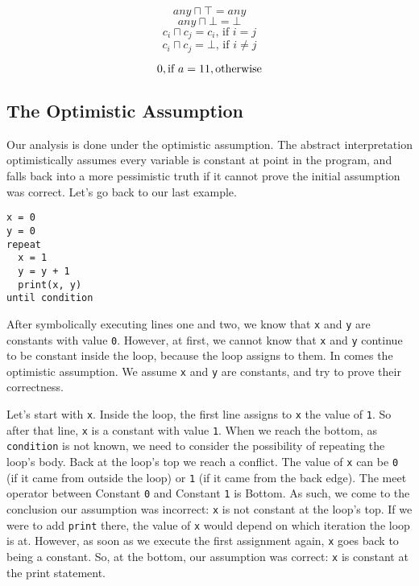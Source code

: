 \documentclass[
]{article}
\begin{document}
\[
any \sqcap \top = any
\] \[
any \sqcap \bot = \bot
\] \[
c_{i} \sqcap c_{j} = c_{i},\,\text{if } i = j
\] \[
c_{i} \sqcap c_{j} = \bot,\,\text{if } i \ne j
\]

\[
0, \text{if}\ a=1 \\
1, \text{otherwise}
\]

\hypertarget{the-optimistic-assumption}{%
\subsection{The Optimistic Assumption}\label{the-optimistic-assumption}}

Our analysis is done under the optimistic assumption. The abstract
interpretation optimistically assumes every variable is constant at
point in the program, and falls back into a more pessimistic truth if it
cannot prove the initial assumption was correct. Let's go back to our
last example.

\begin{verbatim}
x = 0
y = 0
repeat
  x = 1
  y = y + 1
  print(x, y)
until condition
\end{verbatim}

After symbolically executing lines one and two, we know that \texttt{x}
and \texttt{y} are constants with value \texttt{0}. However, at first,
we cannot know that \texttt{x} and \texttt{y} continue to be constant
inside the loop, because the loop assigns to them. In comes the
optimistic assumption. We assume \texttt{x} and \texttt{y} are
constants, and try to prove their correctness.

Let's start with \texttt{x}. Inside the loop, the first line assigns to
\texttt{x} the value of \texttt{1}. So after that line, \texttt{x} is a
constant with value \texttt{1}. When we reach the bottom, as
\texttt{condition} is not known, we need to consider the possibility of
repeating the loop's body. Back at the loop's top we reach a conflict.
The value of \texttt{x} can be \texttt{0} (if it came from outside the
loop) or \texttt{1} (if it came from the back edge). The meet operator
between Constant \texttt{0} and Constant \texttt{1} is Bottom. As such,
we come to the conclusion our assumption was incorrect: \texttt{x} is
not constant at the loop's top. If we were to add \texttt{print} there,
the value of \texttt{x} would depend on which iteration the loop is at.
However, as soon as we execute the first assignment again, \texttt{x}
goes back to being a constant. So, at the bottom, our assumption was
correct: \texttt{x} is constant at the print statement.
\end{document}
